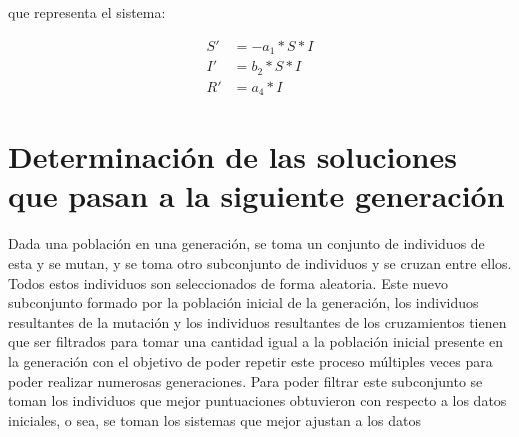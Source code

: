 \begin{center}
\begin{adjustbox}{width=0.5\textwidth, keepaspectratio}
    \end{adjustbox}
\end{center}

que representa el sistema:

\begin{align*}
    S' & = - a_1 * S * I \\
    I' & = b_2 * S * I   \\
    R' & = a_4 * I
\end{align*}



\section{Determinación de las soluciones que pasan a la siguiente generación}

Dada una población en una generación, se toma un conjunto de individuos de esta y se mutan, y se toma otro subconjunto de individuos y se cruzan entre ellos. Todos estos individuos son seleccionados de forma aleatoria. Este nuevo subconjunto formado por la población inicial de la generación, los individuos resultantes de la mutación y los individuos resultantes de los cruzamientos tienen que ser filtrados para tomar una cantidad igual a la población inicial presente en la generación con el objetivo de poder repetir este proceso múltiples veces para poder realizar numerosas generaciones. Para poder filtrar este subconjunto se toman los individuos que mejor puntuaciones obtuvieron con respecto a los datos iniciales, o sea, se toman los sistemas que mejor ajustan a los datos